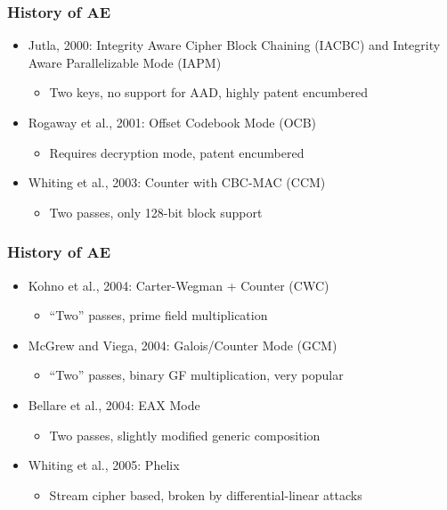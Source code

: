 \begin{frame}
\frametitle{History of AE}
\begin{itemize}
  \item Jutla, 2000: Integrity Aware Cipher Block Chaining (IACBC) and Integrity Aware Parallelizable Mode (IAPM) \cite{Jutla2001_AE}
  \begin{itemize}
    \item Two keys, no support for AAD, highly patent encumbered
  \end{itemize}
  \vfill
  \item Rogaway et al., 2001: Offset Codebook Mode (OCB) \cite{Rogaway2003_OCB}
  \begin{itemize}
    \item Requires decryption mode, patent encumbered
  \end{itemize}
  \vfill
  \item Whiting et al., 2003: Counter with CBC-MAC (CCM) \cite{Whiting2003_CCM}
  \begin{itemize}
    \item Two passes, only 128-bit block support
  \end{itemize}
\end{itemize}
\end{frame}

\begin{frame}
\frametitle{History of AE}
\begin{itemize}
  \item Kohno et al., 2004: Carter-Wegman + Counter (CWC) \cite{Kohno2004_CWC}
  \begin{itemize}
    \item ``Two'' passes, prime field multiplication
  \end{itemize}
  \vfill
  \item McGrew and Viega, 2004: Galois/Counter Mode (GCM) \cite{McGrew2004_GCM}
  \begin{itemize}
    \item ``Two'' passes, binary GF multiplication, very popular
  \end{itemize}
  \vfill
  \item Bellare et al., 2004: EAX Mode \cite{Bellare2004_EAX}
  \begin{itemize}
    \item Two passes, slightly modified generic composition
  \end{itemize}
  \vfill
  \item Whiting et al., 2005: Phelix \cite{Whiting2005_Phelix}
  \begin{itemize}
    \item Stream cipher based, broken by differential-linear attacks \cite{Wu2007_PhelixAttack}
  \end{itemize}
\end{itemize}
\end{frame}

